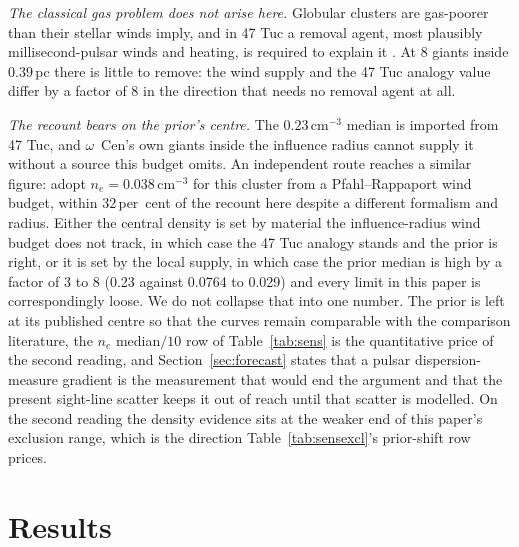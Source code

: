 \documentclass[11pt]{article}
\newcommand{\ocen}{$\omega$~Cen}
\begin{document}
\emph{The classical gas problem does not arise here.} Globular clusters are gas-poorer than their stellar winds imply, and in 47 Tuc a removal agent, most plausibly millisecond-pulsar winds and heating, is required to explain it \citep{Freire2001,Abbate2018}. At $8$ giants inside $0.39$\,pc there is little to remove: the wind supply and the 47 Tuc analogy value differ by a factor of $8$ in the direction that needs no removal agent at all.

\emph{The recount bears on the prior's centre.} The $0.23\,\mathrm{cm^{-3}}$ median is imported from 47 Tuc, and \ocen's own giants inside the influence radius cannot supply it without a source this budget omits. An independent route reaches a similar figure: \citet{Haggard2013} adopt $n_{e} = 0.038\,\mathrm{cm^{-3}}$ for this cluster from a Pfahl--Rappaport wind budget, within $32$\,per~cent of the recount here despite a different formalism and radius. Either the central density is set by material the influence-radius wind budget does not track, in which case the 47 Tuc analogy stands and the prior is right, or it is set by the local supply, in which case the prior median is high by a factor of $3$ to $8$ (0.23 against 0.0764 to 0.029) and every limit in this paper is correspondingly loose. We do not collapse that into one number. The prior is left at its published centre so that the curves remain comparable with the comparison literature, the $n_{e}$ median$/10$ row of Table~\ref{tab:sens} is the quantitative price of the second reading, and Section~\ref{sec:forecast} states that a pulsar dispersion-measure gradient is the measurement that would end the argument and that the present sight-line scatter keeps it out of reach until that scatter is modelled. On the second reading the density evidence sits at the weaker end of this paper's exclusion range, which is the direction Table~\ref{tab:sensexcl}'s prior-shift row prices.

\section{Results}
\label{sec:results}
\end{document}
